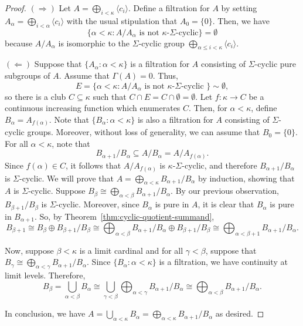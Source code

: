 \documentclass[a4paper]{amsart}
\theoremstyle{definition}
\theoremstyle{remark}
\numberwithin{equation}{section}
\begin{document}
    \begin{proof}
        \((\Rightarrow)\) Let \( A = \bigoplus_{i<\kappa}\langle c_i\rangle\). Define a filtration for \(A\) by setting \(A_\alpha =\bigoplus_{i<\alpha}\langle c_i\rangle\) with the usual stipulation that \(A_0 = \{0\}\). Then, we have
        \[
        \{ \alpha<\kappa : A/A_\alpha \text{ is not \(\kappa\)-\(\Sigma\)-cyclic}\} = \emptyset
        \]
        because \(A/A_\alpha\) is isomorphic to the $\Sigma$-cyclic group $\bigoplus_{\alpha \leq i<\kappa}\langle c_i\rangle$.

        \((\Leftarrow)\) Suppose that \(\{A_\alpha: \alpha<\kappa\}\) is a filtration for \(A\) consisting of $\Sigma$-cyclic pure subgroups of $A$. Assume that \(\Gamma(A) = 0\). Thus,
        \[ E = \{\alpha<\kappa : A/A_\alpha \text{ is not \(\kappa\)-\(\Sigma\)-cyclic }\}\sim \emptyset,\]
        so there is a club \(C\subseteq \kappa\) such that \(C\cap E = C\cap \emptyset = \emptyset\). Let \(f\colon \kappa \to C \) be a continuous increasing function which enumerates \(C\). Then, for \(\alpha<\kappa\), define \(B_\alpha = A_{f(\alpha)}\). Note that \(\{ B_\alpha : \alpha<\kappa\}\) is also a filtration for \(A\) consisting of \(\Sigma\)-cyclic groups. Moreover, without loss of generality, we can assume that \(B_0 = \{0\}\). For all \(\alpha<\kappa\), note that
        \[
        B_{\alpha+1}/B_\alpha \subseteq A/B_\alpha = A/A_{f(\alpha)}.
        \]
        Since \(f(\alpha) \in C\), it follows that \(A/A_{f(\alpha)}\) is \(\kappa\)-\(\Sigma\)-cyclic, and therefore \(B_{\alpha+1}/B_\alpha\) is \(\Sigma\)-cyclic.
        We will prove that \(A =  \bigoplus_{\alpha<\kappa} B_{\alpha+1}/B_\alpha\) by induction, showing that \(A\) is $\Sigma$-cyclic.
        Suppose $B_{\beta} \cong \bigoplus_{\alpha<\beta} B_{\alpha+1}/B_\alpha$. By our previous observation, $B_{\beta+1}/B_{\beta}$ is $\Sigma$-cyclic. Moreover, since \(B_\alpha\) is pure in \(A\), it is clear that \(B_\alpha\) is pure in \(B_{\alpha+1}\). So, by Theorem~\ref{thm:cyclic-quotient-summand},
        \[
        B_{\beta+1} \cong B_{\beta}\oplus B_{\beta+1}/B_{\beta}
        \cong
        \bigoplus_{\alpha<\beta} B_{\alpha+1}/B_\alpha
        \oplus
        B_{\beta+1}/B_{\beta}  
        \cong
        \bigoplus_{\alpha<\beta+1} B_{\alpha+1}/B_\alpha.
        \]
        
        Now, suppose $\beta < \kappa$ is a limit cardinal and for all $\gamma < \beta$, suppose that $B_{\gamma} \cong\bigoplus_{\alpha<\gamma} B_{\alpha+1}/B_\alpha$. Since $\{B_{\alpha}:\alpha <\kappa\}$ is a filtration, we have continuity at limit levels. Therefore, 
        \[             
            B_{\beta} =  \bigcup_{\alpha < \beta} B_{\alpha} \cong \bigcup_{\gamma < \beta} \bigoplus_{\alpha<\gamma} B_{\alpha+1}/B_\alpha \cong  \bigoplus_{\alpha < \beta} B_{\alpha+1}/B_\alpha.
        \] 

In conclusion, we have \(A = \bigcup_{\alpha<\kappa} B_\alpha = \bigoplus_{\alpha < \kappa}B_{\alpha+1}/B_\alpha\) as desired.
\end{proof} 
\end{document}
